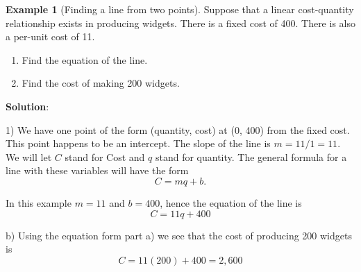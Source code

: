 \documentclass[10pt,]{book}
\newcommand{\terminology}[1]{\textbf{#1}}
\theoremstyle{plain}
\theoremstyle{definition}
\newtheorem{example}[theorem]{Example}
\theoremstyle{definition}
\begin{document}
\begin{example}[Finding a line from two points]\label{example-3}
  Suppose that a linear cost-quantity relationship exists in producing widgets.  There is a fixed cost of \textdollar{}400.  There is also a per-unit cost of \textdollar{}11.%
\leavevmode%
\begin{enumerate}[label=(\alph*)]
\item\hypertarget{li-18}{}Find the equation of the line.%
\item\hypertarget{li-19}{}Find the cost of making 200 widgets.%
\end{enumerate}
\par
\terminology{Solution}:%
\par
 1) We have one point of the form (quantity, cost) at (0, 400) from the fixed cost.  This point happens to be an intercept.  The slope of the line is \(m=11/1=11\).  We will let \(C\) stand for Cost and \(q\) stand for quantity. The general formula for a line with these variables will have the form
\begin{equation*}C=m q+b.\end{equation*}%
\par
In this example \(m = 11\) and \(b = 400\), hence the equation of the line is
\begin{equation*}C=11 q+400\end{equation*}%
\par
b) Using the equation form part a) we see that the cost of producing 200 widgets is
\begin{equation*}C=11 (200)+400=2,600\end{equation*}
%
\end{example}
\end{document}
